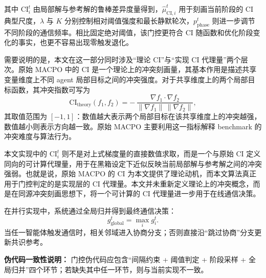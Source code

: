 \documentclass[conference]{IEEEtran}
\begin{document}
其中 $\mathrm{CI}_i^t$ 由局部解与参考解的鲁棒差异度量得到，$\hat{\mu}_{\mathrm{CI},i}^t$ 用于刻画当前阶段的 CI 典型尺度，$\lambda$ 与 $K$ 分别控制相对阈值强度和最长静默轮次，$p_{\mathrm{phase}}^t$ 则进一步调节不同阶段的通信频率。相比固定绝对阈值，该门控更符合 CI 随函数和优化阶段变化的事实，也更不容易出现零触发退化。

需要说明的是，本文在这一部分同时涉及“理论 CI”与“实现 CI 代理量”两个层次。原始 MACPO 中的 CI 是一个理论上的冲突刻画量，其基本作用是描述共享变量维度上不同 agent 局部目标之间的冲突强度。对于共享维度上的两个局部目标函数，其冲突指数可写为
\[
\mathrm{CI}_{\mathrm{theory}}(f_1,f_2)= -\,\frac{\nabla f_1\cdot \nabla f_2}{\|\nabla f_1\|\,\|\nabla f_2\|},
\]
其取值范围为 $[-1,1]$：数值越大表示两个局部目标在该共享维度上的冲突越强，数值越小则表示方向越一致。原始 MACPO 主要利用这一指标解释 benchmark 的冲突难度与算法行为。

本文实现中的 $\mathrm{CI}_i^t$ 则不是对上式梯度量的直接数值求取，而是一个与原始 CI 定义同向的可计算代理量，用于在黑箱设定下近似反映当前局部解与参考解之间的冲突强弱。也就是说，原始 MACPO 的 CI 为本文提供了理论动机，而本文算法真正用于门控判定的是实现层的 CI 代理量。本文并未重新定义理论上的冲突概念，而是在同源冲突刻画思想下，将一个可计算的 CI 代理量进一步用于在线通信决策。

在并行实现中，系统通过全局归并得到最终通信决策：
\[
g_{\mathrm{global}}^t=\max_i g_i^t.
\]
当任一智能体触发通信时，相关邻域进入协商分支；否则直接沿“跳过协商”分支更新共识参考。

\textbf{伪代码一致性说明：} 门控伪代码应包含“间隔约束 + 阈值判定 + 阶段采样 + 全局归并”四个环节；若缺失其中任一环节，则与当前实现不一致。
\end{document}
